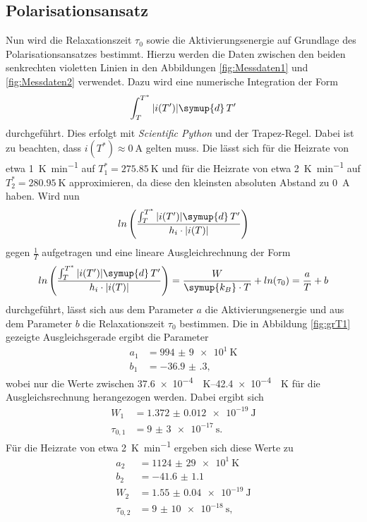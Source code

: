 \subsection{Polarisationsansatz}
\label{sec:grT}
Nun wird die Relaxationszeit $\tau_0$ sowie die Aktivierungsenergie auf Grundlage des Polarisationsansatzes bestimmt.
Hierzu werden die Daten zwischen den beiden senkrechten violetten Linien in den Abbildungen \ref{fig:Messdaten1} und \ref{fig:Messdaten2} verwendet.
Dazu wird eine numerische Integration der Form
\begin{equation}
    \label{eqn:int}
    \int_T^{T^*} |i(T')| \symup{d}\,T'
\end{equation}
durchgeführt. Dies erfolgt mit \textit{Scientific Python} \cite{scipy} und der Trapez-Regel. Dabei ist zu beachten, dass $i(T^*) \approx \SI{0}{\ampere}$ gelten muss.
Die lässt sich für die Heizrate von etwa \SI{1}{\kelvin\per\minute} auf $T^*_1 = \SI{275.85}{\kelvin}$ und für die Heizrate von etwa \SI{2}{\kelvin\per\minute} 
auf $T^*_2 = \SI{280.95}{\kelvin}$ approximieren, da diese den kleinsten absoluten Abstand zu \SI{0}{\ampere} haben.
Wird nun
\begin{equation*}
    ln\left(\frac{\int_T^{T^*} |i(T')| \symup{d}\,T'}{h_i \cdot |i(T)|}\right)
\end{equation*}
gegen $\frac{1}{T}$ aufgetragen und eine lineare Ausgleichrechnung der Form
\begin{equation}
    \label{eqn:lin2}
    ln\left(\frac{\int_T^{T^*} |i(T')| \symup{d}\,T'}{h_i \cdot |i(T)|}\right) = \frac{W}{\symup{k_B} \cdot T} + ln(\tau_0) = \frac{a}{T} + b
\end{equation}
durchgeführt, lässt sich aus dem Parameter $a$ die Aktivierungsenergie und aus dem Parameter $b$ die Relaxationszeit $\tau_0$ bestimmen.
Die in Abbildung \ref{fig:grT1} gezeigte Ausgleichsgerade ergibt die Parameter
\begin{align*}
    a_1 &= \SI{994(9)e1}{\kelvin} \\
    b_1 &= \num{-36.9(3)},
\end{align*}
wobei nur die Werte zwischen \SIrange{37.6e-4}{42.4e-4}{\per\kelvin} für die Ausgleichsrechnung herangezogen werden. Dabei ergibt sich
\begin{align*}
    W_1 &= \SI{1.372(12)e-19}{\joule} \\
    \tau_{0,1} &= \SI{9(3)e-17}{\second}.
\end{align*}
Für die Heizrate von etwa \SI{2}{\kelvin\per\minute} ergeben sich diese Werte zu
\begin{align*}
    a_2 &= \SI{1124(29)e1}{\kelvin} \\
    b_2 &= \num{-41.6(11)} \\
    W_2 &= \SI{1.55(4)e-19}{\joule} \\
    \tau_{0,2} &= \SI{9(10)e-18}{\second},
\end{align*}
